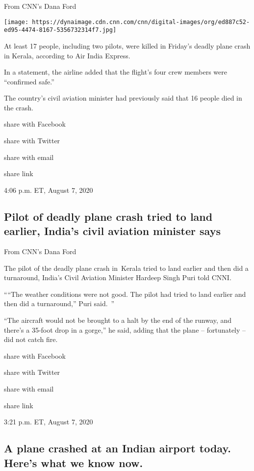 From CNN's Dana Ford

\texttt{[image: https://dynaimage.cdn.cnn.com/cnn/digital-images/org/ed887c52-ed95-4474-8167-5356732314f7.jpg]}

At least 17 people, including two pilots, were killed in Friday's deadly
plane crash in Kerala, according to Air India Express.~

In a statement, the airline added that the flight's four crew members
were ``confirmed safe.''~

The country's civil aviation minister had previously said that 16 people
died in the crash.

share with Facebook

share with Twitter

share with email

share link

4:06 p.m. ET, August 7, 2020

\hypertarget{pilot-of-deadly-plane-crash-tried-to-land-earlier-indias-civil-aviation-minister-says}{%
\subsection{Pilot of deadly plane crash tried to land earlier, India's
civil aviation minister
says}\label{pilot-of-deadly-plane-crash-tried-to-land-earlier-indias-civil-aviation-minister-says}}

From CNN's Dana Ford

The pilot of the deadly plane crash in~Kerala tried to land earlier and
then did a turnaround, India's Civil Aviation Minister Hardeep Singh
Puri told CNNI.~

````The weather conditions were not good. The pilot had tried to land
earlier and then did a turnaround,'' Puri said.~''

``The aircraft would not be brought to a halt by the end of the runway,
and there's a 35-foot drop in a gorge,'' he said, adding that the plane
-- fortunately -- did not catch fire.

share with Facebook

share with Twitter

share with email

share link

3:21 p.m. ET, August 7, 2020

\hypertarget{a-plane-crashed-at-an-indian-airport-today-heres-what-we-know-now}{%
\subsection{A plane crashed at an Indian airport today. Here's what we
know
now.}\label{a-plane-crashed-at-an-indian-airport-today-heres-what-we-know-now}}

